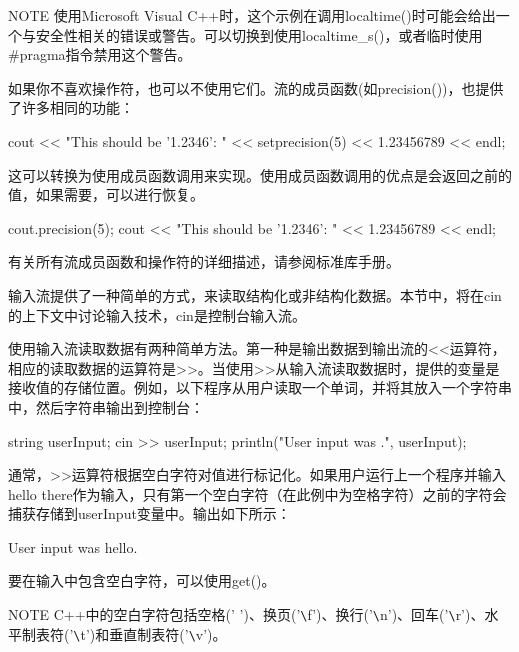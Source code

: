 \begin{myNotic}{NOTE}
使用Microsoft Visual C++时，这个示例在调用localtime()时可能会给出一个与安全性相关的错误或警告。可以切换到使用localtime\_s()，或者临时使用\#pragma指令禁用这个警告。
\end{myNotic}

如果你不喜欢操作符，也可以不使用它们。流的成员函数(如precision())，也提供了许多相同的功能：

\begin{cpp}
cout << "This should be '1.2346': " << setprecision(5) << 1.23456789 << endl;
\end{cpp}

这可以转换为使用成员函数调用来实现。使用成员函数调用的优点是会返回之前的值，如果需要，可以进行恢复。

\begin{cpp}
cout.precision(5);
cout << "This should be '1.2346': " << 1.23456789 << endl;
\end{cpp}

有关所有流成员函数和操作符的详细描述，请参阅标准库手册。


输入流提供了一种简单的方式，来读取结构化或非结构化数据。本节中，将在cin的上下文中讨论输入技术，cin是控制台输入流。


使用输入流读取数据有两种简单方法。第一种是输出数据到输出流的<{}<运算符，相应的读取数据的运算符是>{}>。当使用>{}>从输入流读取数据时，提供的变量是接收值的存储位置。例如，以下程序从用户读取一个单词，并将其放入一个字符串中，然后字符串输出到控制台：

\begin{cpp}
string userInput;
cin >> userInput;
println("User input was {}.", userInput);
\end{cpp}

通常，>{}>运算符根据空白字符对值进行标记化。如果用户运行上一个程序并输入hello there作为输入，只有第一个空白字符（在此例中为空格字符）之前的字符会捕获存储到userInput变量中。输出如下所示：

\begin{shell}
User input was hello.
\end{shell}

要在输入中包含空白字符，可以使用get()。

\begin{myNotic}{NOTE}
C++中的空白字符包括空格(' ')、换页('\verb|\|f')、换行('\verb|\|n')、回车('\verb|\|r')、水平制表符('\verb|\|t')和垂直制表符('\verb|\|v')。
\end{myNotic}

